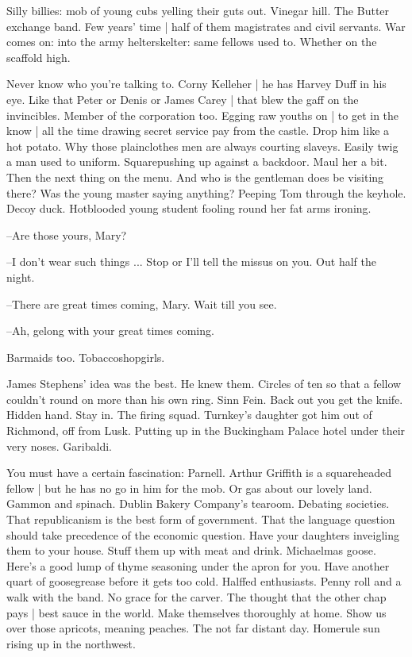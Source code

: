 Silly billies:
mob of young cubs yelling their guts out.
Vinegar hill.
The Butter exchange band.
Few years' time |
half of them magistrates and civil servants.
War comes on:
into the army helterskelter:
same fellows used to.
Whether on the scaffold high.

Never know who you're talking to.
Corny Kelleher |
he has Harvey Duff in his eye.
Like that Peter or Denis or James Carey |
that blew the gaff on the invincibles.
Member of the corporation too.
Egging raw youths on |
to get in the know |
all the time drawing secret service pay from the castle.
Drop him like a hot potato.
Why those plainclothes men are always courting slaveys.
Easily twig a man used to uniform.
Squarepushing up
against a backdoor.
Maul her a bit.
Then the next thing on the menu.
And who is the gentleman does be visiting there?
Was the young master saying anything?
Peeping Tom through the keyhole.
Decoy duck.
Hotblooded young student fooling round her fat arms ironing.

--Are those yours,
Mary?

--I don't wear such things ...
Stop or I'll tell the missus on you.
Out half the night.

--There are great times coming,
Mary.
Wait till you see.

--Ah,
gelong with your great times coming.

Barmaids too.
Tobaccoshopgirls.

James Stephens' idea was the best.
He knew them.
Circles of ten so
that a fellow couldn't round on more than his own ring.
Sinn Fein.
Back out you get the knife.
Hidden hand.
Stay in.
The firing squad.
Turnkey's daughter got him out of Richmond,
off from Lusk.
Putting up in the Buckingham Palace hotel under their very noses.
Garibaldi.

You must have a certain fascination:
Parnell.
Arthur Griffith is a squareheaded fellow |
but he has no go in him for the mob.
Or gas about our lovely land.
Gammon and spinach.
Dublin Bakery Company's tearoom.
Debating societies.
That republicanism is the best form of government.
That the language question should take precedence of the economic question.
Have your daughters inveigling them to your house.
Stuff them up with meat and drink.
Michaelmas goose.
Here's a good lump of thyme seasoning under the apron for you.
Have another quart of goosegrease before it gets too cold.
Halffed enthusiasts.
Penny roll and a walk with the band.
No grace for the carver.
The thought that the other chap pays |
best sauce in the world.
Make themselves thoroughly at home.
Show us over those apricots,
meaning peaches.
The not far distant day.
Homerule sun rising up in the northwest.

